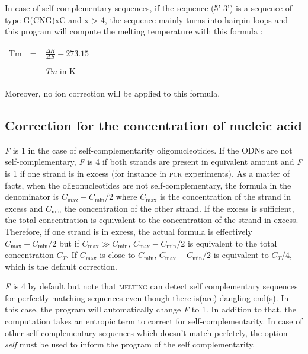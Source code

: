 \documentclass{article}
\begin{document}
In case of self complementary sequences, if the sequence (5' 3') is a sequence of type G(CNG)xC 
and x > 4, the sequence mainly turns into hairpin loops and this program will compute the melting
temperature with this formula :


   
\begin{tabular}[h]{rcp{1.6in}p{2.2in}}
Tm & = & \begin{math} \frac{\Delta{}H}{\Delta{}S} - 273.15 \end{math} \\
   &   &                                                                                                                                                \\
   &   & \footnotesize \textit{Tm} in K 
\end{tabular}


Moreover, no ion correction will be applied to this formula.

\subsection{Correction for the concentration of nucleic acid }  

\textit{F} is 1 in the case of self-complementarity oligonucleotides. If the
ODNs are not self-complementary, \textit{F} is 4 if both strands are present in
equivalent amount and \textit{F} is 1 if one strand is in excess (for instance
in \textsc{pcr} experiments).  As a matter of facts, when the oligonucleotides are not self-complementary, 
the formula in the denominator is $C_{\mbox{max}} - C_{\mbox{min}}/2$ where $C_{\mbox{max}}$ is the concentration of the strand in excess
and $C_{\mbox{min}}$ the concentration of the other strand. If the excess is sufficient, the total concentration is equivalent to the concentration of the strand in excess. Therefore, if one strand is in excess, the actual formula is effectively $C_{\mbox{max}} -
C_{\mbox{min}}/2$ but if $C_{\mbox{max}} \gg C_{\mbox{min}}$, $C_{\mbox{max}}
- C_{\mbox{min}}/2$ is equivalent to the total concentration $C_T$.  If $C_{\mbox{max}}$ is close
to $C_{\mbox{min}}$, $C_{\mbox{max}} - C_{\mbox{min}}/2$ is equivalent to $C_T/4$, which is the default
correction.

\textit{F} is 4 by default but note that \textsc{melting} can detect self complementary sequences 
for perfectly matching sequences even though there is(are) dangling end(s). In this case, the program will 
automatically change \textit{F} to 1. In addition to that, the computation takes an entropic term to correct 
for self-complementarity.
In case of other self complementary sequences which doesn't match perfetcly, the option \textit{-self} must be
used to inform the program of the self complementarity.
\end{document}
